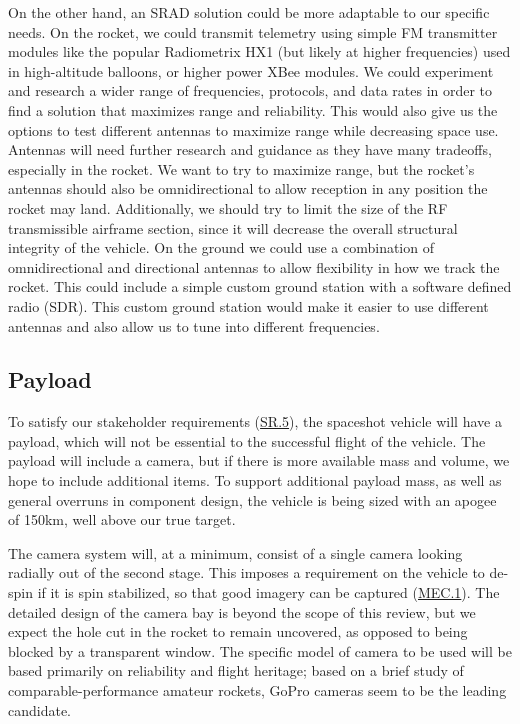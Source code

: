 On the other hand, an SRAD solution could be more adaptable to our specific needs. On the rocket, we could transmit telemetry using simple FM transmitter modules like the popular Radio\-metrix HX1 (but likely at higher frequencies) used in high-altitude balloons, or higher power XBee modules. We could experiment and research a wider range of frequencies, protocols, and data rates in order to find a solution that maximizes range and reliability. This would also give us the options to test different antennas to maximize range while decreasing space use.  Antennas will need further research and guidance as they have many tradeoffs, especially in the rocket. We want to try to maximize range, but the rocket’s antennas should also be omnidirectional to allow reception in any position the rocket may land. Additionally, we should try to limit the size of the RF transmissible airframe section, since it will decrease the overall structural integrity of the vehicle. On the ground we could use a combination of omnidirectional and directional antennas to allow flexibility in how we track the rocket. This could include a simple custom ground station with a software defined radio (SDR). This custom ground station would make it easier to use different antennas and also allow us to tune into different frequencies.


\subsection{Payload}
To satisfy our stakeholder requirements (\hyperlink{SR.5}{SR.5}), the spaceshot vehicle will have a payload, which will not be essential to the successful flight of the vehicle. The payload will include a camera, but if there is more available mass and volume,  we hope to include additional items. To support additional payload mass, as well as general overruns in component design, the vehicle is being sized with an apogee of 150km, well above our true target.

The camera system will, at a minimum, consist of a single camera looking radially out of the second stage. This imposes a requirement on the vehicle to de-spin if it is spin stabilized, so that good imagery can be captured (\hyperlink{MEC.1}{MEC.1}). The detailed design of the camera bay is beyond the scope of this review, but we expect the hole cut in the rocket to remain uncovered, as opposed to being blocked by a transparent window. The specific model of camera to be used will be based primarily on reliability and flight heritage; based on a brief study of comparable-performance amateur rockets, GoPro cameras seem to be the leading candidate.

